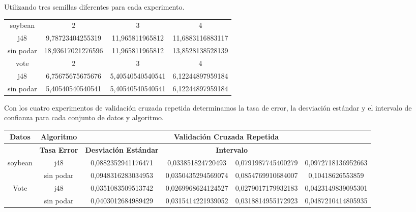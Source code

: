 \documentclass{article}
\begin{document}
\hspace{0.5cm} Utilizando tres semillas diferentes para cada experimento.

\begin{table}[h]
	\begin{adjustbox}{center}
	\begin{tabular}{|c|c|c|c|}
		\hline
		\rowcolor[gray]{0.8}
		\multicolumn{4}{|c|}{\textbf{Porcentaje}}\\ \hline
		
		\rowcolor[gray]{0.8}
		soybean & 2 & 3 & 4 \\ \hline
		
		j48 & 9,78723404255319 & 11,965811965812 & 11,6883116883117 \\ \hline 
		
		sin podar & 18,93617021276596 & 11,965811965812 & 13,8528138528139 \\ \hline

		\rowcolor[gray]{0.8}
		vote & 2 & 3 & 4 \\ \hline	
		
		j48 & 6,75675675675676 & 5,40540540540541 & 6,12244897959184 \\ \hline
		
		sin podar & 5,40540540540541 & 5,40540540540541 & 6,12244897959184\\ \hline
	\end{tabular}
	\end{adjustbox}
\end{table}

Con los cuatro experimentos de validación cruzada repetida determinamos la tasa de error, la desviación estándar y el intervalo de confianza para cada conjunto de datos y algoritmo.

\begin{table}[h]
	\begin{adjustbox}{center}
		\begin{tabular}{|c|c|c|c|c|c|}
			\hline
			\rowcolor[gray]{0.8}
			\textbf{Datos} & \textbf{Algoritmo} & \multicolumn{4}{|c|}{\textbf{Validación Cruzada Repetida}} \\ \hline
			\rowcolor[gray]{0.8}			
			\multicolumn{2}{|c|}{\textbf{ }} & \textbf{Tasa Error} & \textbf{Desviación Estándar} & 			\multicolumn{2}{|c|}{\textbf{Intervalo}} \\ \hline
			
			soybean & j48 & 0,0882352941176471 & 0,033851824720493 & 0,0791987745400279 & 0,0972718136952663\\ \hline
			 & sin podar	 & 0,0948316283034953 & 0,0350435294569074 & 0,0854769910684007 & 0,10418626553859\\ \hline
			Vote	 & j48 & 0,0351083509513742 & 0,0269968624124527 & 0,0279017179932183 & 0,0423149839095301\\ \hline
			 & sin podar	 & 0,0403012684989429 & 0,0315414221939052 & 0,0318814955172923 & 0,0487210414805935\\ \hline
		\end{tabular}
	\end{adjustbox}
\end{table}
\end{document}
